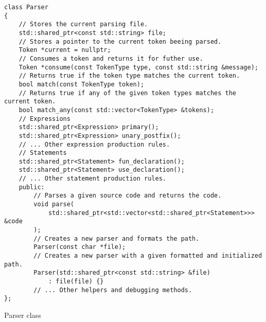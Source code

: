 \begin{listing}[H]
\begin{verbatim}
class Parser
{
    // Stores the current parsing file.
    std::shared_ptr<const std::string> file;
    // Stores a pointer to the current token beeing parsed.
    Token *current = nullptr;
    // Consumes a token and returns it for futher use.
    Token *consume(const TokenType type, const std::string &message);
    // Returns true if the token type matches the current token.
    bool match(const TokenType token);
    // Returns true if any of the given token types matches the current token.
    bool match_any(const std::vector<TokenType> &tokens);
    // Expressions
    std::shared_ptr<Expression> primary();
    std::shared_ptr<Expression> unary_postfix();
    // ... Other expression production rules.
    // Statements
    std::shared_ptr<Statement> fun_declaration();
    std::shared_ptr<Statement> use_declaration();
    // ... Other statement production rules.
    public:
        // Parses a given source code and returns the code.
        void parse(
            std::shared_ptr<std::vector<std::shared_ptr<Statement>>> &code
        );
        // Creates a new parser and formats the path.
        Parser(const char *file);
        // Creates a new parser with a given formatted and initialized path.
        Parser(std::shared_ptr<const std::string> &file)
            : file(file) {}
        // ... Other helpers and debugging methods.
};
\end{verbatim}
\caption{Parser class}
\label{ls:parser_class}
\end{listing}
